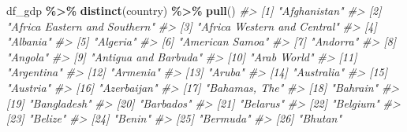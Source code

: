 \documentclass[
  xelatex, ja=standard]{bxjsbook}
\newenvironment{Shaded}{\begin{snugshade}}{\end{snugshade}}
\newcommand{\CommentTok}[1]{\textcolor[rgb]{0.56,0.35,0.01}{\textit{#1}}}
\newcommand{\FunctionTok}[1]{\textcolor[rgb]{0.13,0.29,0.53}{\textbf{#1}}}
\newcommand{\NormalTok}[1]{#1}
\newcommand{\SpecialCharTok}[1]{\textcolor[rgb]{0.81,0.36,0.00}{\textbf{#1}}}
\theoremstyle{definition}
\theoremstyle{definition}
\theoremstyle{definition}
\theoremstyle{definition}
\theoremstyle{remark}
\begin{document}
\begin{Shaded}
\begin{Highlighting}[]
\NormalTok{df\_gdp }\SpecialCharTok{\%\textgreater{}\%} \FunctionTok{distinct}\NormalTok{(country) }\SpecialCharTok{\%\textgreater{}\%} \FunctionTok{pull}\NormalTok{()}
\CommentTok{\#\textgreater{}   [1] "Afghanistan"                                         }
\CommentTok{\#\textgreater{}   [2] "Africa Eastern and Southern"                         }
\CommentTok{\#\textgreater{}   [3] "Africa Western and Central"                          }
\CommentTok{\#\textgreater{}   [4] "Albania"                                             }
\CommentTok{\#\textgreater{}   [5] "Algeria"                                             }
\CommentTok{\#\textgreater{}   [6] "American Samoa"                                      }
\CommentTok{\#\textgreater{}   [7] "Andorra"                                             }
\CommentTok{\#\textgreater{}   [8] "Angola"                                              }
\CommentTok{\#\textgreater{}   [9] "Antigua and Barbuda"                                 }
\CommentTok{\#\textgreater{}  [10] "Arab World"                                          }
\CommentTok{\#\textgreater{}  [11] "Argentina"                                           }
\CommentTok{\#\textgreater{}  [12] "Armenia"                                             }
\CommentTok{\#\textgreater{}  [13] "Aruba"                                               }
\CommentTok{\#\textgreater{}  [14] "Australia"                                           }
\CommentTok{\#\textgreater{}  [15] "Austria"                                             }
\CommentTok{\#\textgreater{}  [16] "Azerbaijan"                                          }
\CommentTok{\#\textgreater{}  [17] "Bahamas, The"                                        }
\CommentTok{\#\textgreater{}  [18] "Bahrain"                                             }
\CommentTok{\#\textgreater{}  [19] "Bangladesh"                                          }
\CommentTok{\#\textgreater{}  [20] "Barbados"                                            }
\CommentTok{\#\textgreater{}  [21] "Belarus"                                             }
\CommentTok{\#\textgreater{}  [22] "Belgium"                                             }
\CommentTok{\#\textgreater{}  [23] "Belize"                                              }
\CommentTok{\#\textgreater{}  [24] "Benin"                                               }
\CommentTok{\#\textgreater{}  [25] "Bermuda"                                             }
\CommentTok{\#\textgreater{}  [26] "Bhutan"                                              }

\end{Highlighting}
\end{Shaded}
\end{document}
